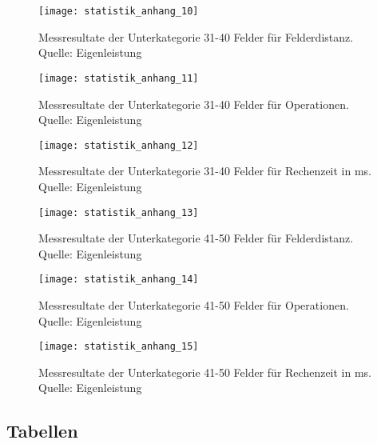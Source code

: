 \begin{figure}[H]
  \centering
  \texttt{[image: statistik\_anhang\_10]}
  \caption[Messresultate der Unterkategorie 31-40 Felder für Felderdistanz.]{Messresultate der Unterkategorie 31-40 Felder für Felderdistanz. Quelle: Eigenleistung}
\end{figure}
\begin{figure}[H]
  \centering
  \texttt{[image: statistik\_anhang\_11]}
  \caption[Messresultate der Unterkategorie 31-40 Felder für Operationen.]{Messresultate der Unterkategorie 31-40 Felder für Operationen. Quelle: Eigenleistung}
\end{figure}
\begin{figure}[H]
  \centering
  \texttt{[image: statistik\_anhang\_12]}
  \caption[Messresultate der Unterkategorie 31-40 Felder für Rechenzeit in ms.]{Messresultate der Unterkategorie 31-40 Felder für Rechenzeit in ms. Quelle: Eigenleistung}
\end{figure}
\begin{figure}[H]
  \centering
  \texttt{[image: statistik\_anhang\_13]}
  \caption[Messresultate der Unterkategorie 41-50 Felder für Felderdistanz.]{Messresultate der Unterkategorie 41-50 Felder für Felderdistanz. Quelle: Eigenleistung}
\end{figure}
\begin{figure}[H]
  \centering
  \texttt{[image: statistik\_anhang\_14]}
  \caption[Messresultate der Unterkategorie 41-50 Felder für Operationen.]{Messresultate der Unterkategorie 41-50 Felder für Operationen. Quelle: Eigenleistung}
\end{figure}
\begin{figure}[H]
  \centering
  \texttt{[image: statistik\_anhang\_15]}
  \caption[Messresultate der Unterkategorie 41-50 Felder für Rechenzeit in ms.]{Messresultate der Unterkategorie 41-50 Felder für Rechenzeit in ms. Quelle: Eigenleistung}
\end{figure}
\subsection{Tabellen}

